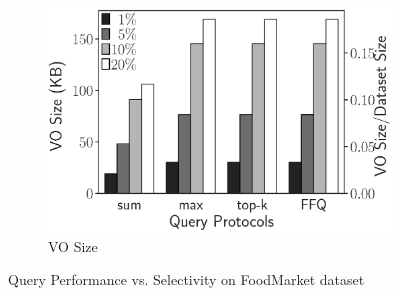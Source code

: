 \begin{figure}[t]
\begin{subfigure}[b]{.37\linewidth}
    \includegraphics[width=\linewidth]{exp-figs/aggregate-queries/foodmarket_vo.eps}
    \caption{VO Size}
  \end{subfigure}
  \caption{Query Performance vs. Selectivity on FoodMarket dataset}\label{fig:aggregate-queries:foodmarket}


\end{figure}

